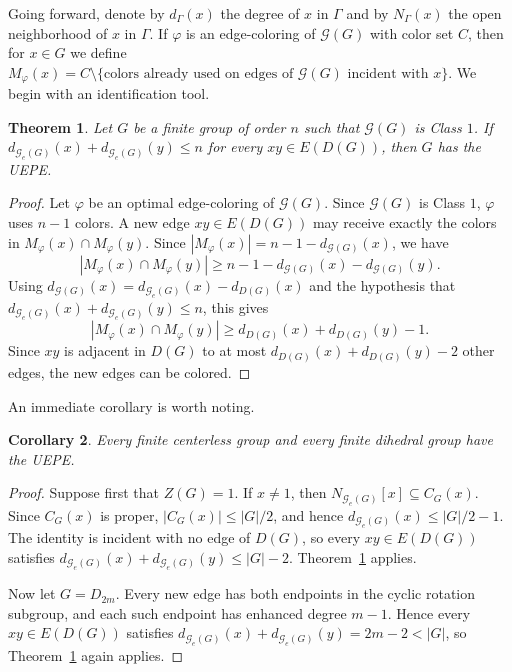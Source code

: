 \documentclass{article}
\newtheorem{theorem}{Theorem}[section]
\newtheorem{corollary}[theorem]{Corollary}
\theoremstyle{definition}
\theoremstyle{indentclaim}
\theoremstyle{named}
\theoremstyle{named}
\begin{document}
\medskip

Going forward, denote by $d_\Gamma(x)$ the degree of $x$ in $\Gamma$ and by $N_{\Gamma}(x)$ the open neighborhood of $x$ in $\Gamma$. If $\varphi$ is an edge-coloring of $\mathscr G(G)$ with color set $C$, then for $x\in G$ we define $M_\varphi(x)=C\setminus\{\text{colors already used on edges of }\mathscr G(G)\text{ incident with }x\}$. We begin with an identification tool. 

\begin{theorem}\label{thm:criterion}
Let \(G\) be a finite group of order \(n\) such that \(\mathscr G(G)\) is Class \(1\). If $d_{\mathscr G_e(G)}(x)+d_{\mathscr G_e(G)}(y)\le n$ for every \(xy\in E(D(G))\), then \(G\) has the UEPE.

\end{theorem}


\begin{proof}
Let \(\varphi\) be an optimal edge-coloring of \(\mathscr G(G)\). Since \(\mathscr G(G)\) is Class \(1\), \(\varphi\) uses \(n-1\) colors. A new edge \(xy\in E(D(G))\) may receive exactly the colors in \(M_\varphi(x)\cap M_\varphi(y)\). Since $|M_\varphi(x)|=n-1-d_{\mathscr G(G)}(x)$,
we have
\[
|M_\varphi(x)\cap M_\varphi(y)|
\ge n-1-d_{\mathscr G(G)}(x)-d_{\mathscr G(G)}(y).
\]
Using \(d_{\mathscr G(G)}(x)=d_{\mathscr G_e(G)}(x)-d_{D(G)}(x)\) and the hypothesis that $d_{\mathscr G_e(G)}(x) + d_{\mathscr G_e(G)}(y) \leq n$, this gives
\[
|M_\varphi(x)\cap M_\varphi(y)|
\ge d_{D(G)}(x)+d_{D(G)}(y)-1.
\]
Since \(xy\) is adjacent in \(D(G)\) to at most \(d_{D(G)}(x)+d_{D(G)}(y)-2\) other edges, the new edges can be colored.  
\end{proof}

An immediate corollary is worth noting. 

\begin{corollary}\label{cor:centerless-dihedral}
Every finite centerless group and every finite dihedral group have the UEPE.
\end{corollary}

\begin{proof}
Suppose first that \(Z(G)=1\). If \(x\neq1\), then \(N_{\mathscr G_e(G)}[x]\subseteq C_G(x)\). Since \(C_G(x)\) is proper, \(|C_G(x)|\le |G|/2\), and hence \(d_{\mathscr G_e(G)}(x)\le |G|/2-1\). The identity is incident with no edge of \(D(G)\), so every \(xy\in E(D(G))\) satisfies $d_{\mathscr G_e(G)}(x)+d_{\mathscr G_e(G)}(y)\le |G|-2$.
Theorem~\ref{thm:criterion} applies.

Now let \(G=D_{2m}\). Every new edge has both endpoints in the cyclic rotation subgroup, and each such endpoint has enhanced degree \(m-1\). Hence every \(xy\in E(D(G))\) satisfies $d_{\mathscr G_e(G)}(x)+d_{\mathscr G_e(G)}(y)=2m-2<|G|$,
so Theorem~\ref{thm:criterion} again applies.
\end{proof}
\end{document}
